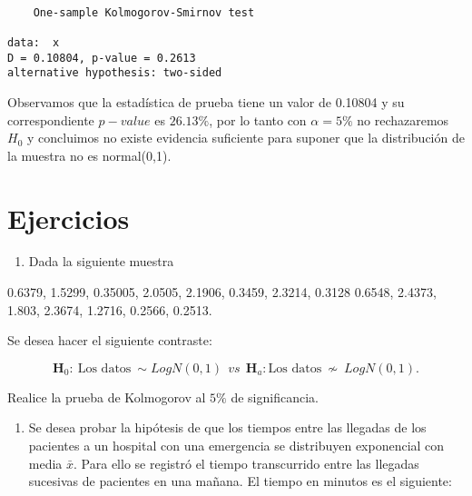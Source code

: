 \documentclass[
  a4paper,
  oneside,
  openany]{book}
\newenvironment{Shaded}{\begin{snugshade}}{\end{snugshade}}
\newcommand{\DecValTok}[1]{\textcolor[rgb]{0.00,0.00,0.81}{#1}}
\newcommand{\FunctionTok}[1]{\textcolor[rgb]{0.13,0.29,0.53}{\textbf{#1}}}
\newcommand{\NormalTok}[1]{#1}
\newcommand{\OtherTok}[1]{\textcolor[rgb]{0.56,0.35,0.01}{#1}}
\newcommand{\SpecialCharTok}[1]{\textcolor[rgb]{0.81,0.36,0.00}{\textbf{#1}}}
\newcommand{\StringTok}[1]{\textcolor[rgb]{0.31,0.60,0.02}{#1}}
\providecommand{\tightlist}{%
  \setlength{\itemsep}{0pt}\setlength{\parskip}{0pt}}
\begin{document}
\begin{Shaded}
\end{Shaded}

\begin{verbatim}

    One-sample Kolmogorov-Smirnov test

data:  x
D = 0.10804, p-value = 0.2613
alternative hypothesis: two-sided
\end{verbatim}

Observamos que la estadística de prueba tiene un valor de 0.10804 y su correspondiente \(p-value\) es \(26.13\%\), por lo tanto con \(\alpha=5\%\) no rechazaremos \(H_0\) y concluimos no existe evidencia suficiente para suponer que la distribución de la muestra no es normal(0,1).

\hypertarget{ejercicios-13}{%
\section{Ejercicios}\label{ejercicios-13}}

\begin{enumerate}
\def\labelenumi{\arabic{enumi}.}
\tightlist
\item
  Dada la siguiente muestra
\end{enumerate}

0.6379, 1.5299, 0.35005, 2.0505, 2.1906, 0.3459, 2.3214, 0.3128
0.6548, 2.4373, 1.803, 2.3674, 1.2716, 0.2566, 0.2513.

Se desea hacer el siguiente contraste:

\[\textbf{H}_0: \ \mbox{Los datos} \ \sim LogN(0,1) \ \ vs \ \ \textbf{H}_a: \mbox{Los datos} \  \nsim \ LogN(0,1).\]

Realice la prueba de Kolmogorov al \(5\%\) de significancia.

\begin{enumerate}
\def\labelenumi{\arabic{enumi}.}
\setcounter{enumi}{1}
\tightlist
\item
  Se desea probar la hipótesis de que los tiempos entre las llegadas de los pacientes a un hospital con una emergencia se distribuyen exponencial con media \(\bar{x}\). Para ello se registró el tiempo transcurrido entre las llegadas sucesivas de pacientes en una mañana. El tiempo en minutos es el siguiente:
\end{enumerate}
\end{document}
